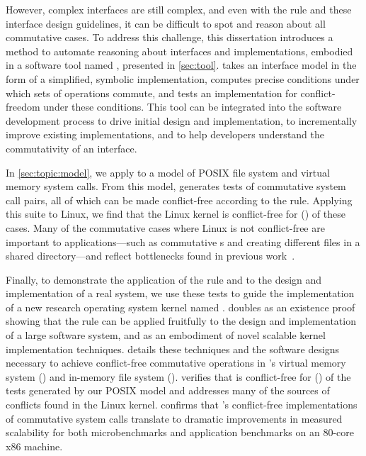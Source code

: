 However, complex interfaces are still complex, and even with the rule
and these interface design guidelines, it can be difficult to spot and
reason about all commutative cases.
%
%
To address this challenge, this dissertation introduces a method to
automate reasoning about interfaces and implementations, embodied in a
software tool named \tool, presented in \cref{sec:tool}.
%
\tool takes an interface model
in the form of a simplified, symbolic implementation, computes precise
conditions under which sets of operations commute, and tests an
implementation for conflict-freedom under these conditions.  This tool can be
integrated into the software development process to drive initial design and
implementation, to incrementally improve existing implementations, and to
help developers understand the commutativity of an interface.

In \cref{sec:topic:model}, we apply \tool to a model of
 POSIX file system and virtual memory system
calls.
%
From this model,
\tool generates  tests of commutative
system call pairs, all of which can be made conflict-free
according to the rule.
%
Applying this suite to Linux, we find that the Linux kernel is
conflict-free for 
() of
these cases.
%
Many of the commutative cases where Linux is not conflict-free are
important to applications---such as commutative
s and creating different files in a shared directory---and
reflect bottlenecks found in previous
work~\cite{boyd-wickizer:scaling}.

Finally, to demonstrate the application of the rule and \tool to the
design and implementation of a real system, we use these tests to
guide the implementation of a new research operating system kernel
named \sys.
%
\sys doubles as an existence proof showing that the rule can be
applied fruitfully to the design and implementation of a large
software system, and as an embodiment of novel scalable kernel
implementation techniques.
%
 details these techniques and the software designs
necessary to achieve conflict-free commutative operations in \sys's
virtual memory system (\vm) and in-memory file system (\fs).
%
\tool verifies that \sys is conflict-free for
()
of the tests generated by our POSIX model and addresses many of the
sources of conflicts found in the Linux kernel.
%
 confirms that \sys's conflict-free implementations of
commutative system calls translate to dramatic improvements in
measured scalability for both microbenchmarks and application
benchmarks on an 80-core x86 machine.


